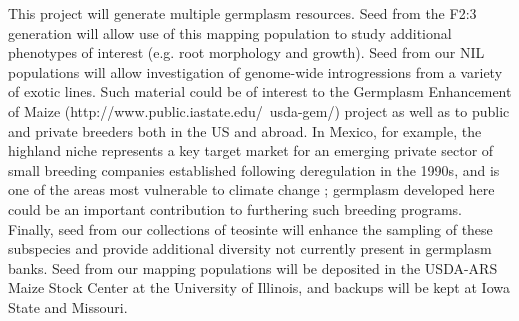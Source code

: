 This project will generate multiple germplasm resources.  Seed from the F2:3 generation will allow use of this mapping population to study additional phenotypes of interest (e.g. root morphology and growth).  Seed from our NIL populations will allow investigation of genome-wide introgressions from a variety of exotic lines.  Such material could be of interest to the Germplasm Enhancement of Maize (http://www.public.iastate.edu/~usda-gem/) project as well as to public and private breeders both in the US and abroad. In Mexico, for example, the highland niche represents a key target market for an emerging private sector of small breeding companies established following deregulation in the 1990s, and is one of the areas most vulnerable to climate change \citep{Bellon2011}; germplasm developed here could be an important contribution to furthering such breeding programs. Finally, seed from our collections of teosinte will enhance the sampling of these subspecies and provide additional diversity not currently present in germplasm banks.  Seed from our mapping populations will be deposited in the USDA-ARS Maize Stock Center at the University of Illinois, and backups will be kept at Iowa State and Missouri.




